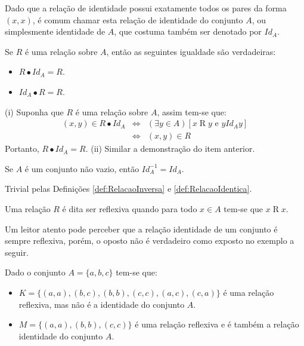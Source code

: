 Dado que a relação de identidade possui exatamente todos os pares da forma $(x, x)$, é comum chamar esta relação de identidade do conjunto $A$, ou simplesmente identidade de $A$, que costuma também ser denotado por $Id_A$.


\begin{teorema}\label{teo:NeutralidadeRelacaoIdentidade}
	Se $R$ é uma relação sobre $A$, então as seguintes igualdade são verdadeiras:
	\begin{itemize}
		\item[(i)] $R \bullet Id_A = R$.
		\item[(ii)] $Id_A \bullet R = R$.
	\end{itemize}
\end{teorema}

\begin{prova}
	(i) Suponha que $R$ é uma relação sobre $A$, assim tem-se que:
	\begin{eqnarray*}
		(x, y) \in R \bullet Id_A  & \Longleftrightarrow & (\exists y \in A)[x \mathrel{R} y \text{ e } y \mathrel{Id_A} y]\\
		& \Longleftrightarrow & (x, y) \in R 
	\end{eqnarray*}
	Portanto,  $R \bullet Id_A = R$. (ii) Similar a demonstração do item anterior.
\end{prova}


\begin{lema}\label{prop:ComplementarDaRelacaoIdentica}
	Se $A$ é um conjunto não vazio, então $Id_A^{-1} = Id_A$.
\end{lema}

\begin{prova}
	Trivial pelas Definições \ref{def:RelacaoInversa} e \ref{def:RelacaoIdentica}.
\end{prova}

\begin{definicao}\label{def:RelacaoReflexiva}
	Uma relação $R$ é dita ser reflexiva quando para todo $x \in A$ tem-se que $x \mathrel{R} x$.
\end{definicao}

Um leitor atento pode perceber que a relação identidade de um conjunto é sempre reflexiva, porém, o oposto não é verdadeiro como exposto no exemplo a seguir.

\begin{exemplo}
	Dado o conjunto $A = \{a, b, c\}$ tem-se que: 
	\begin{itemize}
		\item[(a)] $K = \{(a, a), (b, c), (b, b), (c, c), (a, c), (c, a)\}$ é uma relação reflexiva, mas não é a identidade do conjunto $A$.
		\item[(a)] $M = \{(a, a), (b, b), (c, c) \}$ é uma relação reflexiva e é  também a relação identidade do conjunto $A$.
	\end{itemize}
\end{exemplo}


